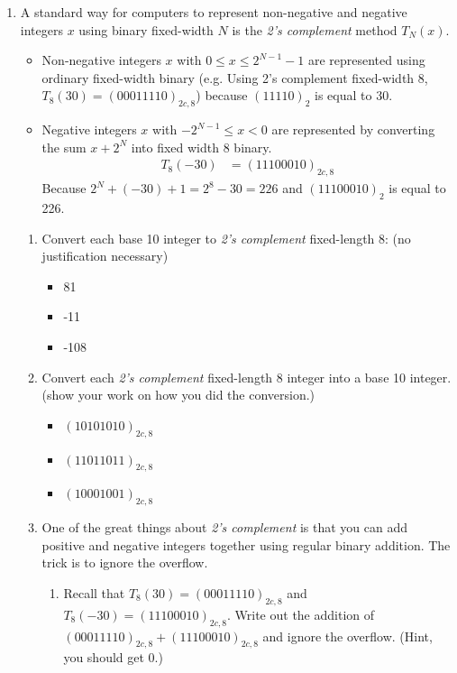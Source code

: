 \documentclass[10pt,letterpaper,unboxed,cm]{article}
\begin{document}
\begin{enumerate}
	\item
	      A standard way for computers to represent non-negative and negative integers $x$ using binary fixed-width $N$ is the \emph{2's complement} method $T_N(x)$.
	      \begin{itemize}
		      \item
		            Non-negative integers $x$ with $0\leq x\leq 2^{N-1}-1$ are represented using ordinary fixed-width binary (e.g. Using 2's complement fixed-width 8, $T_{8}(30)=(00011110)_{2c,8}$) because $(11110)_2$ is equal to 30.
		      \item Negative integers $x$ with $-2^{N-1} \leq x<0$ are represented by converting the sum $x+2^N$ into fixed width 8 binary.
		            \begin{align*}
			            T_{8}(-30) & = (11100010)_{2c,8}
		            \end{align*}
		            Because $2^{N}+(-30)+1 = 2^8-30 = 226$
		            and $(11100010)_2$ is equal to 226.
	      \end{itemize}

	      \begin{enumerate}
		      \item
		            Convert each base 10 integer to \emph{2's complement} fixed-length 8: (no justification necessary)
		            \begin{itemize}
			            \item
			                  81
			            \item
			                  -11
			            \item
			                  -108
		            \end{itemize}
		      \item
		            Convert each \emph{2's complement} fixed-length 8 integer into a base 10 integer. (show your work on how you did the conversion.)
		            \begin{itemize}
			            \item
			                  $(10101010)_{2c,8}$
			            \item
			                  $(11011011)_{2c,8}$
			            \item
			                  $(10001001)_{2c,8}$
		            \end{itemize}
		      \item
		            One of the great things about \emph{2's complement} is that you can add positive and negative integers together using regular binary addition. The trick is to ignore the overflow.
		            \begin{enumerate}
			            \item
			                  Recall that $T_{8}(30) = (00011110)_{2c,8}$ and $T_{8}(-30)=(11100010)_{2c,8}$. Write out the addition of $(00011110)_{2c,8}+(11100010)_{2c,8}$ and ignore the overflow. (Hint, you should get 0.)


\end{enumerate}
\end{enumerate}
\end{enumerate}
\end{document}
